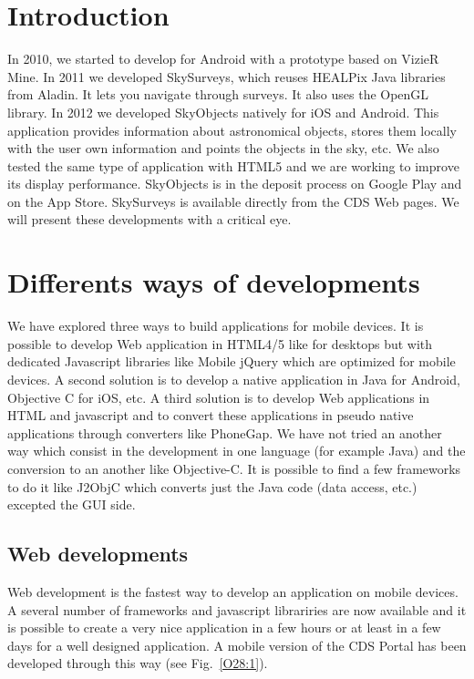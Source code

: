 \section{Introduction}
In 2010, we started to develop for Android with a prototype based on VizieR Mine. In 2011 we developed SkySurveys, which reuses HEALPix Java libraries from Aladin. It lets you navigate through surveys. It also uses the OpenGL library. In 2012 we developed SkyObjects natively for iOS and Android. This application provides information about astronomical objects, stores them locally with the user own information and points the objects in the sky, etc. We also tested the same type of application with HTML5 and we are working to improve its display performance. SkyObjects is in the deposit process on Google Play and on the App Store. SkySurveys is available directly from the CDS Web pages. We will present these developments with a critical eye.

\section{Differents ways of developments}

We have explored three ways to build applications for mobile devices.
It is possible to develop Web application in HTML4/5 like for desktops but with dedicated Javascript libraries like Mobile jQuery which are optimized for mobile devices.
A second solution is to develop a native application in Java for Android, Objective C for iOS, etc. 
A third solution is to develop Web applications in HTML and javascript and to convert these applications in pseudo native applications through converters like PhoneGap.
We have not tried an another way which consist in the development in one language (for example Java) and the conversion to an another like Objective-C. It is possible to find a few frameworks to do it like J2ObjC which converts just the Java code (data access, etc.) excepted the GUI side.

\subsection{Web developments}
Web development is the fastest way to develop an application on mobile devices. A several number of frameworks and javascript librariries are now available and it is possible to create a very nice application in a few hours or at least in a few days for a well designed application.
A mobile version of the CDS Portal has been developed through this way (see Fig.~\ref{O28:1}).

